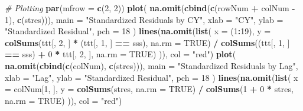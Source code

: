\documentclass[]{article}
\newenvironment{Shaded}{\begin{snugshade}}{\end{snugshade}}
\newcommand{\CommentTok}[1]{\textcolor[rgb]{0.56,0.35,0.01}{\textit{#1}}}
\newcommand{\DataTypeTok}[1]{\textcolor[rgb]{0.13,0.29,0.53}{#1}}
\newcommand{\DecValTok}[1]{\textcolor[rgb]{0.00,0.00,0.81}{#1}}
\newcommand{\KeywordTok}[1]{\textcolor[rgb]{0.13,0.29,0.53}{\textbf{#1}}}
\newcommand{\NormalTok}[1]{#1}
\newcommand{\OperatorTok}[1]{\textcolor[rgb]{0.81,0.36,0.00}{\textbf{#1}}}
\newcommand{\OtherTok}[1]{\textcolor[rgb]{0.56,0.35,0.01}{#1}}
\newcommand{\StringTok}[1]{\textcolor[rgb]{0.31,0.60,0.02}{#1}}
\begin{document}
\begin{Shaded}
\begin{Highlighting}[]
  \CommentTok{# Plotting}
  \KeywordTok{par}\NormalTok{(}\DataTypeTok{mfrow =} \KeywordTok{c}\NormalTok{(}\DecValTok{2}\NormalTok{, }\DecValTok{2}\NormalTok{))}
  \KeywordTok{plot}\NormalTok{(}
    \KeywordTok{na.omit}\NormalTok{(}\KeywordTok{cbind}\NormalTok{(}\KeywordTok{c}\NormalTok{(rowNum }\OperatorTok{+}\StringTok{ }\NormalTok{colNum }\OperatorTok{-}\StringTok{ }\DecValTok{1}\NormalTok{), }\KeywordTok{c}\NormalTok{(stres))),}
    \DataTypeTok{main =} \StringTok{"Standardized Residuals by CY"}\NormalTok{,}
    \DataTypeTok{xlab =} \StringTok{"CY"}\NormalTok{,}
    \DataTypeTok{ylab =} \StringTok{"Standardized Residual"}\NormalTok{,}
    \DataTypeTok{pch =} \DecValTok{18}
\NormalTok{  )}
  \KeywordTok{lines}\NormalTok{(}\KeywordTok{na.omit}\NormalTok{(}\KeywordTok{list}\NormalTok{(}
    \DataTypeTok{x =}\NormalTok{ (}\DecValTok{1}\OperatorTok{:}\DecValTok{19}\NormalTok{),}
    \DataTypeTok{y =} \KeywordTok{colSums}\NormalTok{(ttt[, }\DecValTok{2}\NormalTok{, ] }\OperatorTok{*}
\StringTok{                  }\NormalTok{(ttt[, }\DecValTok{1}\NormalTok{, ] }\OperatorTok{==}\StringTok{ }\NormalTok{sss), }\DataTypeTok{na.rm =} \OtherTok{TRUE}\NormalTok{) }\OperatorTok{/}
\StringTok{      }\KeywordTok{colSums}\NormalTok{((ttt[, }\DecValTok{1}\NormalTok{, ] }\OperatorTok{==}\StringTok{ }\NormalTok{sss) }\OperatorTok{+}
\StringTok{                }\DecValTok{0} \OperatorTok{*}
\StringTok{                }\NormalTok{ttt[, }\DecValTok{2}\NormalTok{, ], }\DataTypeTok{na.rm =} \OtherTok{TRUE}\NormalTok{)}
\NormalTok{  )), }\DataTypeTok{col =} \StringTok{"red"}\NormalTok{)}
  \KeywordTok{plot}\NormalTok{(}
    \KeywordTok{na.omit}\NormalTok{(}\KeywordTok{cbind}\NormalTok{(}\KeywordTok{c}\NormalTok{(colNum), }\KeywordTok{c}\NormalTok{(stres))),}
    \DataTypeTok{main =} \StringTok{"Standardized Residuals by Lag"}\NormalTok{,}
    \DataTypeTok{xlab =} \StringTok{"Lag"}\NormalTok{,}
    \DataTypeTok{ylab =} \StringTok{"Standardized Residual"}\NormalTok{,}
    \DataTypeTok{pch =} \DecValTok{18}
\NormalTok{  )}
  \KeywordTok{lines}\NormalTok{(}\KeywordTok{na.omit}\NormalTok{(}\KeywordTok{list}\NormalTok{(}
    \DataTypeTok{x =}\NormalTok{ colNum[}\DecValTok{1}\NormalTok{, ],}
    \DataTypeTok{y =} \KeywordTok{colSums}\NormalTok{(stres, }\DataTypeTok{na.rm =} \OtherTok{TRUE}\NormalTok{) }\OperatorTok{/}
\StringTok{      }\KeywordTok{colSums}\NormalTok{(}\DecValTok{1} \OperatorTok{+}\StringTok{ }\DecValTok{0} \OperatorTok{*}\StringTok{ }\NormalTok{stres, }\DataTypeTok{na.rm =} \OtherTok{TRUE}\NormalTok{)}
\NormalTok{  )), }\DataTypeTok{col =} \StringTok{"red"}\NormalTok{)}

\end{Highlighting}
\end{Shaded}
\end{document}
